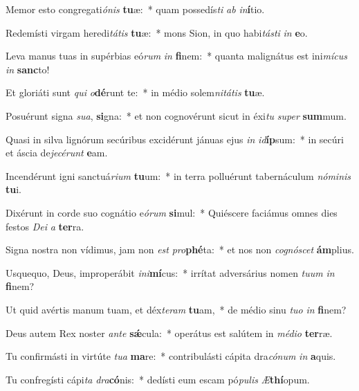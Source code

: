 \item Memor esto congregati\textit{ó}\textit{nis} \textbf{tu}æ:~* quam possedís\textit{ti} \textit{ab} \textit{in}\textbf{í}tio.
\item Redemísti virgam heredi\textit{tá}\textit{tis} \textbf{tu}æ:~* mons Sion, in quo habi\textit{tás}\textit{ti} \textit{in} \textbf{e}o.
\item Leva manus tuas in supérbias eó\textit{rum} \textit{in} \textbf{fi}nem:~* quanta malignátus est ini\textit{mí}\textit{cus} \textit{in} \textbf{sanc}to!
\item Et gloriáti sunt \textit{qui} \textit{o}\textbf{dé}runt te:~* in médio solem\textit{ni}\textit{tá}\textit{tis} \textbf{tu}æ.
\item Posuérunt signa \textit{su}\textit{a}, \textbf{si}gna:~* et non cognovérunt sicut in éxi\textit{tu} \textit{su}\textit{per} \textbf{sum}mum.
\item Quasi in silva lignórum secúribus excidérunt jánuas ejus \textit{in} \textit{id}\textbf{íp}sum:~* in secúri et áscia de\textit{je}\textit{cé}\textit{runt} \textbf{e}am.
\item Incendérunt igni sanctuá\textit{ri}\textit{um} \textbf{tu}um:~* in terra polluérunt tabernáculum \textit{nó}\textit{mi}\textit{nis} \textbf{tu}i.
\item Dixérunt in corde suo cognátio e\textit{ó}\textit{rum} \textbf{si}mul:~* Quiéscere faciámus omnes dies festos \textit{De}\textit{i} \textit{a} \textbf{ter}ra.
\item Signa nostra non vídimus, jam non \textit{est} \textit{pro}\textbf{phé}ta:~* et nos non \textit{co}\textit{gnó}\textit{scet} \textbf{ám}plius.
\item Usquequo, Deus, improperábit \textit{in}\textit{i}\textbf{mí}cus:~* irrítat adversárius nomen \textit{tu}\textit{um} \textit{in} \textbf{fi}nem?
\item Ut quid avértis manum tuam, et déx\textit{te}\textit{ram} \textbf{tu}am,~* de médio sinu \textit{tu}\textit{o} \textit{in} \textbf{fi}nem?
\item Deus autem Rex noster \textit{an}\textit{te} \textbf{sǽ}cula:~* operátus est salútem in \textit{mé}\textit{di}\textit{o} \textbf{ter}ræ.
\item Tu confirmásti in virtúte \textit{tu}\textit{a} \textbf{ma}re:~* contribulásti cápita dra\textit{có}\textit{num} \textit{in} \textbf{a}quis.
\item Tu confregísti cápi\textit{ta} \textit{dra}\textbf{có}nis:~* dedísti eum escam pó\textit{pu}\textit{lis} \textit{Æ}\textbf{thí}opum.
